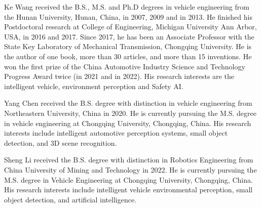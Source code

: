 \documentclass[journal]{IEEEtran}
\begin{document}
\begin{IEEEbiography} {Ke Wang} received the B.S., M.S. and Ph.D degrees in vehicle engineering from the Hunan University, Hunan, China, in 2007, 2009 and in 2013. He finished his Postdoctoral research at College of Engineering, Michigan University Ann Arbor, USA, in 2016 and 2017. Since 2017, he has been an Associate Professor with the State Key Laboratory of Mechanical Transmission, Chongqing University. He is the author of one book, more than 30 articles, and more than 15 inventions. He won the first prize of the China Automotive Industry Science and Technology Progress Award twice (in 2021 and in 2022). His research interests are the intelligent vehicle, environment perception and Safety AI. 
\end{IEEEbiography}
\begin{IEEEbiography} {Yang Chen}  received the B.S. degree with distinction in vehicle engineering from Northeastern University, China in 2020. He is currently pursuing the M.S. degree in vehicle engineering at Chongqing University, Chongqing, China. His research interests include intelligent automotive perception systems, small object detection, and 3D scene recognition. 
\end{IEEEbiography}
\begin{IEEEbiography} {Sheng Li}  received the B.S. degree with distinction in Robotics Engineering from China University of Mining and Technology in 2022. He is currently pursuing the M.S. degree in Vehicle Engineering at Chongqing University, Chongqing, China. His research interests include intelligent vehicle environmental perception, small object detection, and artificial intelligence. 
\end{IEEEbiography}
\end{document}
